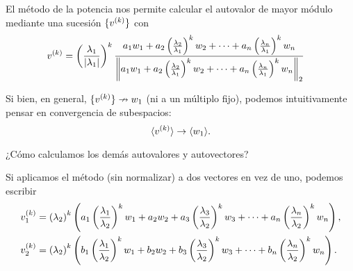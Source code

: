 El método de la potencia nos permite calcular el autovalor de mayor módulo mediante una sucesión $\{\vb^{(k)}\}$ con
$$
\begin{aligned}
\vb^{(k)} &= \left(\frac{\lambda_1}{|\lambda_1|}\right)^k \frac{a_1   \wb_1 + a_2 \left(\frac{\lambda_2}{\lambda_1}\right)^k \wb_2+ \dots + a_n \left(\frac{\lambda_n}{\lambda_1}\right)^k \wb_n}{\left\|a_1 \wb_1 + a_2 \left(\frac{\lambda_2}{\lambda_1}\right)^k \wb_2+ \dots + a_n \left(\frac{\lambda_n}{\lambda_1}\right)^k \wb_n\right\|_2}
\end{aligned}$$

Si bien, en general, $\{\vb^{(k)}\} \nrightarrow \wb_1$ (ni a un múltiplo fijo), podemos intuitivamente pensar en convergencia de subespacios:
$$
\langle \vb^{(k)}\rangle \rightarrow \langle \wb_1 \rangle.
$$

¿Cómo calculamos los demás autovalores y autovectores?

Si aplicamos el método (sin normalizar) a dos vectores en vez de uno, podemos escribir
{\small
$$
\begin{aligned}
\vb_1^{(k)} &= \left(\lambda_2\right)^k \left(a_1 \left(\frac{\lambda_1}{\lambda_2}\right)^k \wb_1 + a_2   \wb_2 + a_3 \left(\frac{\lambda_3}{\lambda_2}\right)^k \wb_3+ \dots + a_n \left(\frac{\lambda_n}{\lambda_2}\right)^k \wb_n \right), \\
\vb_2^{(k)} &= \left(\lambda_2\right)^k \left(b_1 \left(\frac{\lambda_1}{\lambda_2}\right)^k \wb_1 + b_2   \wb_2 + b_3 \left(\frac{\lambda_3}{\lambda_2}\right)^k \wb_3+ \dots + b_n \left(\frac{\lambda_n}{\lambda_2}\right)^k \wb_n \right). \\
\end{aligned}
$$
}

